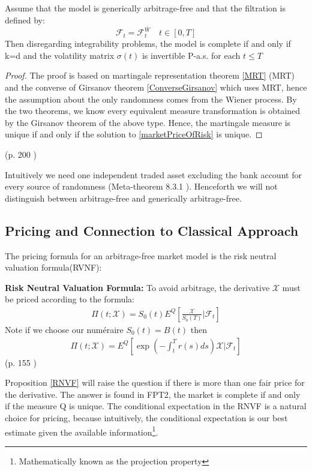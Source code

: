 \begin{proposition}{}\label{completeProp}
Assume that the model is generically arbitrage-free and that the filtration is defined by:
$$\mathcal{F}_t=\mathcal{F}_t^{\bar{W}} \quad t \in [0,T]$$
Then disregarding integrability problems, the model is complete if and only if k=d and the volatility matrix $\sigma(t)$ is invertible P-a.s. for each $t \leq T$
\begin{proof}
The proof is based on martingale representation theorem \ref{MRT} (MRT) and the converse of Girsanov theorem \ref{ConverseGirsanov} which uses MRT, hence the assumption about the only randomness comes from the Wiener process. By the two theorems, we know every equivalent measure transformation is obtained by the Girsanov theorem of the above type. Hence, the martingale measure is unique if and only if the solution to \eqref{marketPriceOfRisk} is unique.                                        
\end{proof}
\null \hfill (p. 200 \parencite{finKont})
\end{proposition}
Intuitively we need one independent traded asset excluding the bank account for every source of randomness (Meta-theorem 8.3.1 \parencite{finKont}). Henceforth we will not distinguish between arbitrage-free and generically arbitrage-free.


\subsection{Pricing and Connection to Classical Approach}
The pricing formula for an arbitrage-free market model is the risk neutral valuation formula(RVNF):
\begin{proposition}{\textbf{Risk Neutral Valuation Formula: }}\label{RNVF}
To avoid arbitrage, the derivative $\mathcal{X}$ must be priced according to the formula:
\begin{align}
\Pi(t;\mathcal{X})=S_0(t)E^Q[\frac{\mathcal{X}}{S_0(T)}|\mathcal{F}_t]
\end{align}
Note if we choose our numéraire $S_0(t)=B(t)$ then
\begin{align}
\Pi(t;\mathcal{X})=E^Q[\exp(-\int_t^T r(s) ds) \mathcal{X}|\mathcal{F}_t]
\end{align}
\null \hfill(p. 155 \parencite{finKont})
\end{proposition}
Proposition \ref{RNVF} will raise the question if there is more than one fair price for the derivative. The answer is found in FPT2, the market is complete if and only if the measure Q is unique. The conditional expectation in the RNVF is a natural choice for pricing, because intuitively, the conditional expectation is our best estimate given the available information\footnote{Mathematically known as the projection property}.\\

